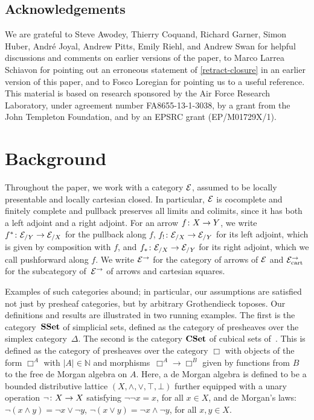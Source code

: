 \documentclass[reqno,10pt,a4paper,oneside,draft]{amsart}
\begin{document}
\subsection*{Acknowledgements}

We are grateful to Steve Awodey, Thierry Coquand, Richard Garner, Simon Huber, Andr\'e Joyal, Andrew Pitts, Emily Riehl, and Andrew Swan for helpful discussions and comments on earlier versions of the paper, to Marco Larrea Schiavon for pointing out an erroneous statement of \cref{retract-closure} in an earlier version of this paper, and to Fosco Loregian for pointing us to a useful reference.
This material is based on research sponsored by the Air Force Research Laboratory, under agreement number FA8655-13-1-3038, by a grant from the John Templeton Foundation, and by an EPSRC grant (EP/M01729X/1).

\section{Background}
\label{sec:bac}

Throughout the paper, we work with a category $\cal{E}$, assumed to be locally presentable and locally cartesian closed.
In particular, $\catE$ is cocomplete and finitely complete and pullback preserves all limits and colimits, since it has both a left adjoint and a right adjoint.
For an arrow $f \co X \to Y$, we write $f^* \co \cal{E}_{/Y} \to \cal{E}_{/X}$ for the pullback along $f$, $f_{!} \co \cal{E}_{/X} \to \cal{E}_{/Y}$ for its left adjoint, which is given by composition with $f$, and $f_* \co \cal{E}_{/X} \to \cal{E}_{/Y}$ for its right adjoint, which we call pushforward along $f$.
We write $\cal{E}^\to$ for the category of arrows of $\cal{E}$ and $\cal{E}^\to_{\mathrm{cart}}$ for the subcategory of~$\cal{E}^\to$ of arrows and cartesian squares.

Examples of such categories abound; in particular, our assumptions are satisfied not just by presheaf categories, but by arbitrary Grothendieck toposes.
Our definitions and results are illustrated in two running examples.
The first is the category~$\SSet$ of simplicial sets, defined as the category of presheaves over the simplex category~$\Delta$.
The second is the category $\CSet$ of cubical sets of~\cite{cohen-et-al:cubicaltt}.
This is defined as the category of presheaves over the category $\Box$ with objects of the form $\Box^A$ with $|A| \in \mathbb{N}$ and morphisms~$\Box^A \to \Box^B$ given by functions from $B$ to the free de Morgan algebra on
$A$. Here, a de Morgan algebra is defined to be a bounded distributive lattice $(X, \land, \lor, \top, \bot)$ further equipped with a unary operation $\neg \co X \to X$ satisfying $\neg \neg x = x$, for all $x \in X$, and de Morgan's laws: $\neg (x \land y) = \neg x \lor \neg y$, $\neg (x \lor y) = \neg x \land \neg y$, for all $x, y \in X$.
\end{document}
